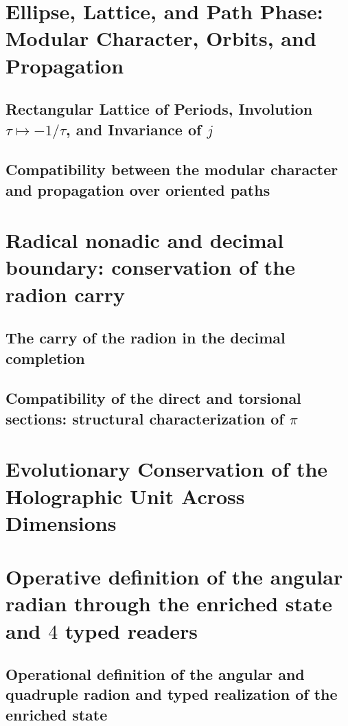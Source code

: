 \section{Ellipse, Lattice, and Path Phase: Modular Character, Orbits, and Propagation}
\subsection{Rectangular Lattice of Periods, Involution \(\tau\mapsto-1/\tau\), and Invariance of \(j\)}

\subsection{Compatibility between the modular character and propagation over oriented paths}


\section{Radical nonadic and decimal boundary: conservation of the radion carry}
\subsection{The carry of the radion in the decimal completion}

\subsection{Compatibility of the direct and torsional sections: structural characterization of \(\pi\)}


\section{Evolutionary Conservation of the Holographic Unit Across Dimensions}


\section{Operative definition of the angular radian through the enriched state and \(4\) typed readers}
\subsection{Operational definition of the angular and quadruple radion and typed realization of the enriched state}


